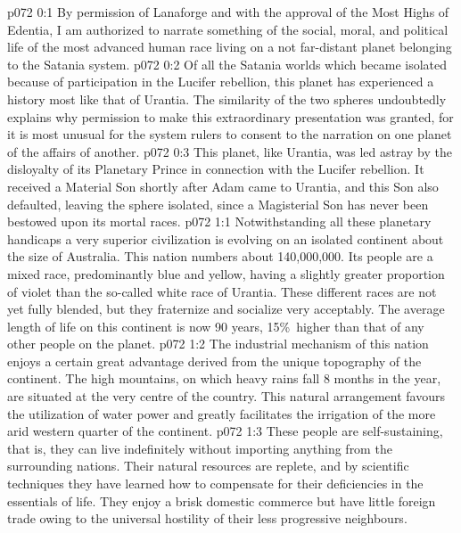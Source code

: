 \author{Melchizedek}
\vs p072 0:1 By permission of Lanaforge and with the approval of the Most Highs of Edentia, I am authorized to narrate something of the social, moral, and political life of the most advanced human race living on a not far\hyp{}distant planet belonging to the Satania system.
\vs p072 0:2 Of all the Satania worlds which became isolated because of participation in the Lucifer rebellion, this planet has experienced a history most like that of Urantia. The similarity of the two spheres undoubtedly explains why permission to make this extraordinary presentation was granted, for it is most unusual for the system rulers to consent to the narration on one planet of the affairs of another.
\vs p072 0:3 This planet, like Urantia, was led astray by the disloyalty of its Planetary Prince in connection with the Lucifer rebellion. It received a Material Son shortly after Adam came to Urantia, and this Son also defaulted, leaving the sphere isolated, since a Magisterial Son has never been bestowed upon its mortal races.
\vs p072 1:1 Notwithstanding all these planetary handicaps a very superior civilization is evolving on an isolated continent about the size of Australia. This nation numbers about 140,000,000. Its people are a mixed race, predominantly blue and yellow, having a slightly greater proportion of violet than the so\hyp{}called white race of Urantia. These different races are not yet fully blended, but they fraternize and socialize very acceptably. The average length of life on this continent is now 90 years, 15\%\ higher than that of any other people on the planet.
\vs p072 1:2 The industrial mechanism of this nation enjoys a certain great advantage derived from the unique topography of the continent. The high mountains, on which heavy rains fall 8 months in the year, are situated at the very centre of the country. This natural arrangement favours the utilization of water power and greatly facilitates the irrigation of the more arid western quarter of the continent.
\vs p072 1:3 These people are self\hyp{}sustaining, that is, they can live indefinitely without importing anything from the surrounding nations. Their natural resources are replete, and by scientific techniques they have learned how to compensate for their deficiencies in the essentials of life. They enjoy a brisk domestic commerce but have little foreign trade owing to the universal hostility of their less progressive neighbours.
